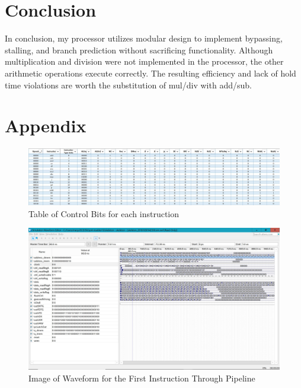\documentclass[letterpaper]{article} %
\begin{document}
\section{Conclusion}
In conclusion, my processor utilizes modular design to implement bypassing, stalling, and branch prediction without sacrificing functionality. Although multiplication and division were not implemented in the processor, the other arithmetic operations execute correctly. The resulting efficiency and lack of hold time violations are worth the substitution of mul/div with add/sub.

\section{Appendix}

\begin{figure}[h]
\begin{center}
\includegraphics[width=1.2\textwidth]{InsnTable1.JPG}
\caption{Table of Control Bits for each instruction}
\label{fig:1}
\end{center}
\end{figure}

\begin{figure}[h]
\begin{center}
\includegraphics[width=1.2\textwidth]{0add0.JPG}
\caption{Image of Waveform for the First Instruction Through Pipeline}
\label{fig:2}
\end{center}
\end{figure}
\end{document}

